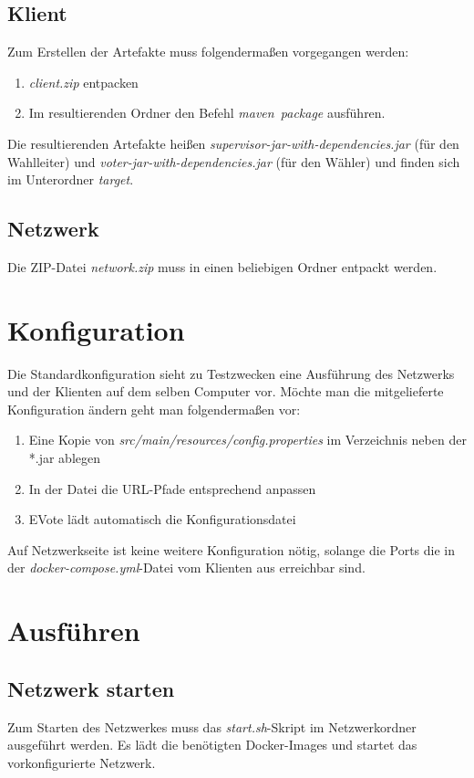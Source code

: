 \documentclass[parskip=full]{scrartcl}
\newcommand{\textitx}[1]{\mbox{\textit{#1}}}
\begin{document}
	\subsection{Klient}
	Zum Erstellen der Artefakte muss folgendermaßen vorgegangen werden:
	\begin{enumerate}
		\item \textit{client.zip} entpacken
		\item Im resultierenden Ordner den Befehl \textitx{maven package} ausführen.
	\end{enumerate}
	Die resultierenden Artefakte heißen \textit{supervisor-jar-with-dependencies.jar} (für den Wahlleiter) und \textit{voter-jar-with-dependencies.jar} (für den Wähler) und finden sich im Unterordner \textit{target}.
	\subsection{Netzwerk}
	Die ZIP-Datei \textit{network.zip} muss in einen beliebigen Ordner entpackt werden. 
	
	\section{Konfiguration}
	Die Standardkonfiguration sieht zu Testzwecken eine Ausführung des Netzwerks und der Klienten auf dem selben Computer vor. Möchte man die mitgelieferte Konfiguration ändern geht man folgendermaßen vor:
	\begin{enumerate}
		\item Eine Kopie von \textit{src/main/resources/config.properties} im Verzeichnis neben der *.jar ablegen
		\item In der Datei die URL-Pfade entsprechend anpassen
		\item EVote lädt automatisch die Konfigurationsdatei
	\end{enumerate}
	Auf Netzwerkseite ist keine weitere Konfiguration nötig, solange die Ports die in der \textit{docker-compose.yml}-Datei vom Klienten aus erreichbar sind.

	\section{Ausführen}
	\subsection{Netzwerk starten}
	Zum Starten des Netzwerkes muss das \textit{start.sh}-Skript im Netzwerkordner ausgeführt werden. Es lädt die benötigten Docker-Images und startet das vorkonfigurierte Netzwerk.
\end{document}
